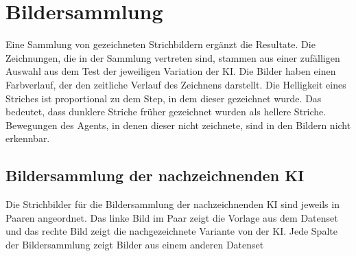\section{Bildersammlung}\label{chap:r_bild} Eine Sammlung von gezeichneten
Strichbildern ergänzt die Resultate. Die Zeichnungen, die in der Sammlung
vertreten sind, stammen aus einer zufälligen Auswahl aus dem Test der jeweiligen
Variation der KI. Die Bilder haben einen Farbverlauf, der den zeitliche Verlauf
des Zeichnens darstellt. Die Helligkeit eines Striches ist proportional zu dem
Step, in dem dieser gezeichnet wurde. Das bedeutet, dass dunklere Striche früher
gezeichnet wurden als hellere Striche. Bewegungen des Agents, in denen dieser
nicht zeichnete, sind in den Bildern nicht erkennbar.


\subsection{Bildersammlung der nachzeichnenden KI}\label{sub:r_bild_nach}

Die Strichbilder für die Bildersammlung der nachzeichnenden KI sind jeweils in Paaren
angeordnet. Das linke Bild im Paar zeigt die Vorlage aus dem Datenset und das
rechte Bild zeigt die nachgezeichnete Variante von der KI. Jede Spalte der
Bildersammlung zeigt Bilder aus einem anderen Datenset

